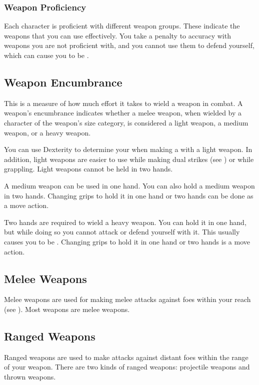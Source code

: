         \subsubsection{Weapon Proficiency}\label{Weapon Proficiency}
            Each character is proficient with different weapon groups. These indicate the weapons that you can use effectively. You take a  penalty to accuracy with weapons you are not proficient with, and you cannot use them to defend yourself, which can cause you to be .

    \subsection{Weapon Encumbrance}\label{Weapon Encumbrance}
        This is a measure of how much effort it takes to wield a weapon in combat. A weapon's encumbrance indicates whether a melee weapon, when wielded by a character of the weapon's size category, is considered a light weapon, a medium weapon, or a heavy weapon.

        \label{Light Weapons} You can use Dexterity to determine your  when making a  with a light weapon.
        In addition, light weapons are easier to use while making dual strikes (see ) or while grappling.
        Light weapons cannot be held in two hands.

         A medium weapon can be used in one hand. You can also hold a medium weapon in two hands. Changing grips to hold it in one hand or two hands can be done as a move action.

         Two hands are required to wield a heavy weapon. You can hold it in one hand, but while doing so you cannot attack or defend yourself with it. This usually causes you to be . Changing grips to hold it in one hand or two hands is a move action.


    \subsection{Melee Weapons}
        Melee weapons are used for making melee attacks against foes within your reach (see ). Most weapons are melee weapons.

    \subsection{Ranged Weapons}
        Ranged weapons are used to make attacks against distant foes within the range of your weapon. There are two kinds of ranged weapons: projectile weapons and thrown weapons.

